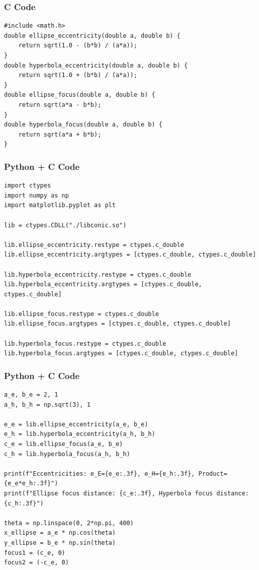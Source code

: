 \documentclass{beamer}
\begin{document}
\begin{frame}[fragile]
    \frametitle{C Code}
    \begin{lstlisting}
#include <math.h>
double ellipse_eccentricity(double a, double b) {
    return sqrt(1.0 - (b*b) / (a*a));
}
double hyperbola_eccentricity(double a, double b) {
    return sqrt(1.0 + (b*b) / (a*a));
}
double ellipse_focus(double a, double b) {
    return sqrt(a*a - b*b);
}
double hyperbola_focus(double a, double b) {
    return sqrt(a*a + b*b);
}
    \end{lstlisting}
\end{frame}
\begin{frame}[fragile]
    \frametitle{Python + C Code}
    \begin{lstlisting}
import ctypes
import numpy as np
import matplotlib.pyplot as plt

lib = ctypes.CDLL("./libconic.so")  

lib.ellipse_eccentricity.restype = ctypes.c_double
lib.ellipse_eccentricity.argtypes = [ctypes.c_double, ctypes.c_double]

lib.hyperbola_eccentricity.restype = ctypes.c_double
lib.hyperbola_eccentricity.argtypes = [ctypes.c_double, ctypes.c_double]

lib.ellipse_focus.restype = ctypes.c_double
lib.ellipse_focus.argtypes = [ctypes.c_double, ctypes.c_double]

lib.hyperbola_focus.restype = ctypes.c_double
lib.hyperbola_focus.argtypes = [ctypes.c_double, ctypes.c_double]

    \end{lstlisting}
\end{frame}
\begin{frame}[fragile]
    \frametitle{Python + C Code}
    \begin{lstlisting}
a_e, b_e = 2, 1
a_h, b_h = np.sqrt(3), 1

e_e = lib.ellipse_eccentricity(a_e, b_e)
e_h = lib.hyperbola_eccentricity(a_h, b_h)
c_e = lib.ellipse_focus(a_e, b_e)
c_h = lib.hyperbola_focus(a_h, b_h)

print(f"Eccentricities: e_E={e_e:.3f}, e_H={e_h:.3f}, Product={e_e*e_h:.3f}")
print(f"Ellipse focus distance: {c_e:.3f}, Hyperbola focus distance: {c_h:.3f}")

theta = np.linspace(0, 2*np.pi, 400)
x_ellipse = a_e * np.cos(theta)
y_ellipse = b_e * np.sin(theta)
focus1 = (c_e, 0)
focus2 = (-c_e, 0)



    \end{lstlisting}
\end{frame}
\end{document}

